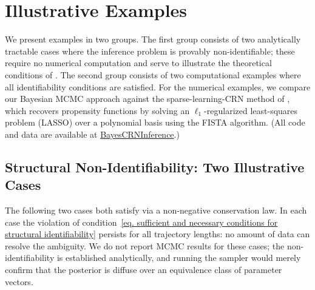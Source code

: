 \section{Illustrative Examples}

We present examples in two groups. The first group consists of two analytically tractable cases where the inference problem is provably non-identifiable; these require no numerical computation and serve to illustrate the theoretical conditions of . The second group consists of two computational examples where all identifiability conditions are satisfied. For the numerical examples, we compare our Bayesian MCMC approach against the sparse-learning-CRN method of \cite{zhang2019learning}, which recovers propensity functions by solving an $\ell_1$-regularized least-squares problem (LASSO) over a polynomial basis using the FISTA algorithm. (All code and data are available at \href{https://github.com/ssindiUCM/BayesCRNInference}{BayesCRNInference}.)

\subsection*{Structural Non-Identifiability: Two Illustrative Cases}

The following two cases both satisfy  via a non-negative conservation law. In each case the violation of condition~\eqref{eq. sufficient and necessary conditions for structural identifiability} persists for all trajectory lengths: no amount of data can resolve the ambiguity. We do not report MCMC results for these cases; the non-identifiability is established analytically, and running the sampler would merely confirm that the posterior is diffuse over an equivalence class of parameter vectors.

